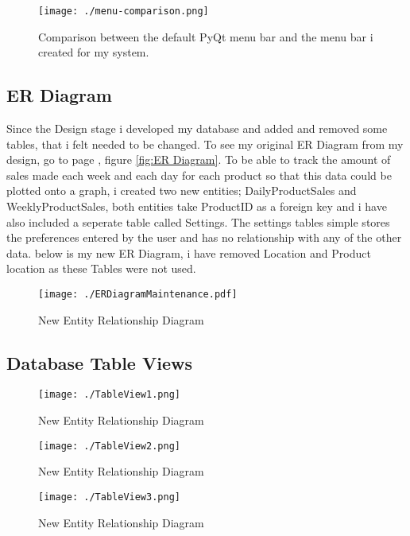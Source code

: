 \begin{figure}[H]
    \texttt{[image: ./menu-comparison.png]}
    \caption{Comparison between the default PyQt menu bar and the menu bar i created for my system.} \label{fig:menu-comparison}
\end{figure}





\subsection{ER Diagram}

Since the Design stage i developed my database and added and removed some tables, that i felt needed to be changed. To see my original ER Diagram from my design, go to page \pageref{fig:ER Diagram}, figure \ref{fig:ER Diagram}. To be able to track the amount of sales made each week and each day for each product so that this data could be plotted onto a graph, i created two new entities; DailyProductSales and WeeklyProductSales, both entities take ProductID as a foreign key and i have also included a seperate table called Settings. The settings tables simple stores the preferences entered by the user and has no relationship with any of the other data. below is my new ER Diagram, i have removed Location and Product location as these Tables were not used.

\begin{figure}[H]
    \texttt{[image: ./ERDiagramMaintenance.pdf]}
    \caption{New Entity Relationship Diagram} \label{fig:entity-relationship-maintenance}
\end{figure}

\subsection{Database Table Views}

\begin{figure}[H]
    \texttt{[image: ./TableView1.png]}
    \caption{New Entity Relationship Diagram} \label{fig:table-view-1}
\end{figure}

\begin{figure}[H]
    \texttt{[image: ./TableView2.png]}
    \caption{New Entity Relationship Diagram} \label{fig:table-view-2}
\end{figure}

\begin{figure}[H]
    \texttt{[image: ./TableView3.png]}
    \caption{New Entity Relationship Diagram} \label{fig:table-view-3}
\end{figure}

